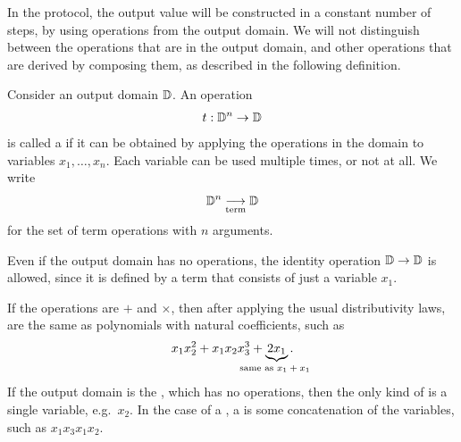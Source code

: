 In the protocol, the output value will be constructed in a constant number of
steps, by using operations from the output domain. We will not distinguish
between the operations that are in the output domain, and other operations
that are derived by composing them, as described in the following definition.

\begin{definition}\label{def:term-operations}
    Consider an output domain $\mathbb D$. An operation 
    \begin{align*}
    t : \mathbb D^n \to \mathbb D
    \end{align*}
    is called a  if it can be obtained by applying the operations in the domain to variables $x_1,\ldots,x_n$. Each variable can be used multiple times, or not at all.  We write 
    \begin{align*}
    \mathbb D^n \underset{\text{term}}{\longrightarrow} \mathbb D
    \end{align*}
    for the set of term operations with $n$ arguments.
\end{definition}

\begin{myexample}\label{ex:identity-term}
    Even if the output domain has no operations, the identity operation $\mathbb D \to \mathbb D$ is allowed, since it is defined by a term that consists of just a variable $x_1$.
\end{myexample}

\begin{myexample}
  If the operations are $+$ and $\times$, then after applying the usual distributivity laws,   are the same as polynomials with natural coefficients, such as 
\begin{align*}
x_1x_2^2 + x_1x_2x_3^3  + \myunderbrace{2x_1}{same as $x_1 + x_1$}.
\end{align*}
If the output domain is the , which has no operations, then the only kind of  is a single variable, e.g.~$x_2$.  In the case of a , a  is some concatenation of the variables, such as $x_1 x_3 x_1 x_2$.
\end{myexample}



